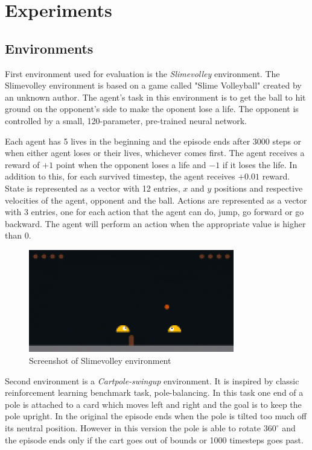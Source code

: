 \chapter{Experiments}
\section{Environments}

First environment used for evaluation is the \emph{Slimevolley} environment. The Slimevolley environment \cite{slimevolleygym} is based on a game called "Slime Volleyball" created by an unknown author. The agent's task in this environment is to get the ball to hit ground on the opponent's side to make the oponent lose a life. The opponent is controlled by a small, 120-parameter, pre-trained neural network. \cite{ha2015slimevolley}

Each agent has 5 lives in the beginning and the episode ends after 3000 steps or when either agent loses or their lives, whichever comes first. The agent receives a reward of $+1$ point when the opponent loses a life and $-1$ if it loses the life. In addition to this, for each survived timestep, the agent receives $+0.01$  reward. State is represented as a vector with 12 entries, $x$ and $y$ positions and respective velocities of the agent, opponent and the ball. Actions are represented as a vector with 3 entries, one for each action that the agent can do, jump, go forward or go backward. The agent will perform an action when the appropriate value is higher than 0.

\begin{figure}[h]
    \caption{Screenshot of Slimevolley environment}
    \includegraphics[width=0.8\textwidth]{img/slimevolley.png}
\end{figure}

Second environment is a \emph{Cartpole-swingup} environment. It is inspired by classic reinforcement learning benchmark task, pole-balancing. In this task one end of a pole is attached to a card which moves left and right and the goal is to keep the pole upright. In the original the episode ends when the pole is tilted too much off its neutral position. However in this version the pole is able to rotate $360^\circ$ and the episode ends only if the cart goes out of bounds or 1000 timesteps goes past.

